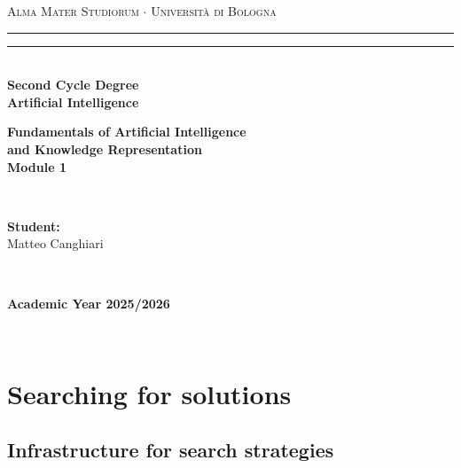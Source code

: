 \documentclass[12pt,a4paper,twoside]{book}
\begin{document}
\pagestyle{empty}
\begin{titlepage}
\begin{center}
    {{\Large{\textsc{Alma Mater Studiorum $\cdot$ Università di Bologna}}}}
    \rule[0.1cm]{\textwidth}{0.1mm}
    \rule[0.5cm]{\textwidth}{0.6mm}\\
    {\small{\bf Second Cycle Degree\\
    Artificial Intelligence}}
\end{center}

\vspace{45mm}

\begin{center}
    \textbf{Fundamentals of Artificial Intelligence \\ and Knowledge Representation \\ Module 1}
\end{center}

\vspace{60mm}
\par
\noindent
\begin{minipage}[t]{0.04\textwidth}
~
\end{minipage}
\begin{minipage}[t]{0.4\textwidth}
{{\textbf{Student:}\\
Matteo Canghiari}}
\end{minipage}
\begin{minipage}[t]{0.04\textwidth}
~
\end{minipage}

\vspace{30mm}

\begin{center}
    {\large{\bf Academic Year 2025/2026}}
\end{center}
\end{titlepage}

\restoregeometry

\pagestyle{empty}
\newpage~\newpage
\thispagestyle{empty}

\clearpage
{}
\pagestyle{plain}

\chapter{Searching for solutions}

\label{c_1}

\section{Infrastructure for search strategies}

\label{s_1_1}
\end{document}
